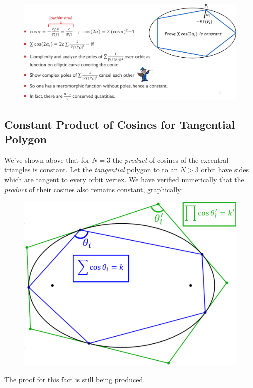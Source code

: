 \documentclass[]{article}
\begin{document}
\begin{figure}[H]

{\centering \includegraphics[width=1\linewidth]{pics/sketch_tabachnikov_proof_sum_of_cosines} 

}

\end{figure}

\hypertarget{constant-product-of-cosines-for-tangential-polygon}{%
\subsection{Constant Product of Cosines for Tangential Polygon}\label{constant-product-of-cosines-for-tangential-polygon}}

We've shown above that for \(N=3\) the \emph{product} of cosines of the excentral triangles is constant. Let the \emph{tangential} polygon to to an \(N>3\) orbit have sides which are tangent to every orbit vertex. We have verified numerically that the \emph{product} of their cosines also remains constant, graphically:

\begin{figure}[H]

{\centering \includegraphics[width=0.5\linewidth]{pics/product_is_constant} 

}

\end{figure}

The proof for this fact is still being produced.
\end{document}
